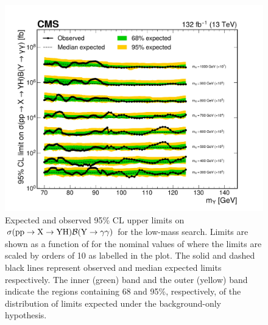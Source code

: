 \begin{figure}
    \centering
    \includegraphics[width=\textwidth]{Figures/Dihiggs/results/limits/limits_stack_mx_y_gg_low_mass_paper.pdf}
    \caption[Low-Mass \XYggHtt Upper Limits in as Function of \mY in Slices of \mX]{Expected and observed 95\% CL upper limits on $\sigma(\mathrm{p}\mathrm{p} \to \mathrm{X} \to \mathrm{Y}\mathrm{H})\mathcal{B}(\mathrm{Y} \to \gamma\gamma)$ for the low-mass \XYggHtt search. Limits are shown as a function of \mY for the nominal values of \mX where the limits are scaled by orders of 10 as labelled in the plot. The solid and dashed black lines represent observed and median expected limits respectively. The inner (green) band and the outer (yellow) band indicate the regions containing 68 and 95\%, respectively, of the distribution of limits expected under the background-only hypothesis.}\label{fig:limits_stack_mx_y_gg_low_mass}
\end{figure}

